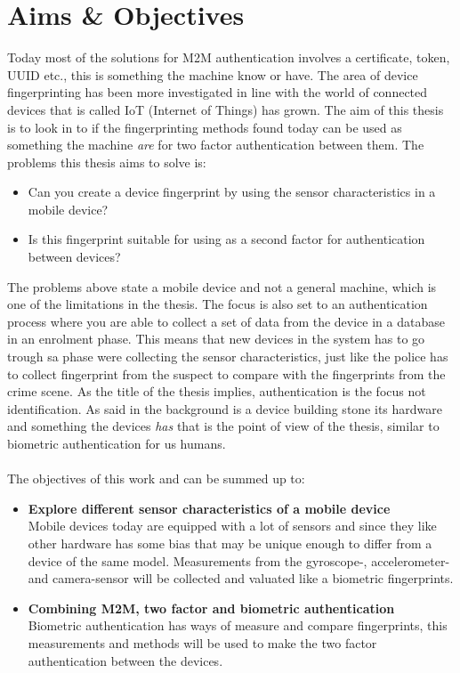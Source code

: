 \section{Aims \& Objectives}\label{sec:aim}
Today most of the solutions for M2M authentication involves a certificate, token, UUID etc., this is something the machine know or have. The area of device fingerprinting has been more investigated in line with the world of connected devices that is called IoT (Internet of Things) has grown. The aim of this thesis is to look in to if the fingerprinting methods found today can be used as something the machine \textit{are} for two factor authentication between them. The problems this thesis aims to solve is:
\begin{itemize}
	\item[] Can you create a device fingerprint by using the sensor characteristics in a mobile device?
	\item[] Is this fingerprint suitable for using as a second factor for authentication between devices?
\end{itemize}
The problems above state a mobile device and not a general machine, which is one of the limitations in the thesis. The focus is also set to an authentication process where you are able to collect a set of data from the device in a database in an enrolment phase. This means that new devices in the system has to go trough sa phase were collecting the sensor characteristics, just like the police has to collect fingerprint from the suspect to compare with the fingerprints from the crime scene. As the title of the thesis implies, authentication is the focus not identification. As said in the background is a device building stone its hardware and something the devices \textit{has} that is the point of view of the thesis, similar to biometric authentication for us humans. \\
\\
The objectives of this work and can be summed up to:
\begin{itemize}
	\item[] \textbf{Explore different sensor characteristics of a mobile device} \\
	Mobile devices today are equipped with a lot of sensors and since they like other hardware has some bias that may be unique enough to differ from a device of the same model. Measurements from the gyroscope-, accelerometer- and camera-sensor will be collected and valuated like a biometric fingerprints.
	\item[] \textbf{Combining M2M, two factor and biometric authentication} \\
	Biometric authentication has ways of measure and compare fingerprints, this measurements and methods will be used to make the two factor authentication between the devices.
\end{itemize}

